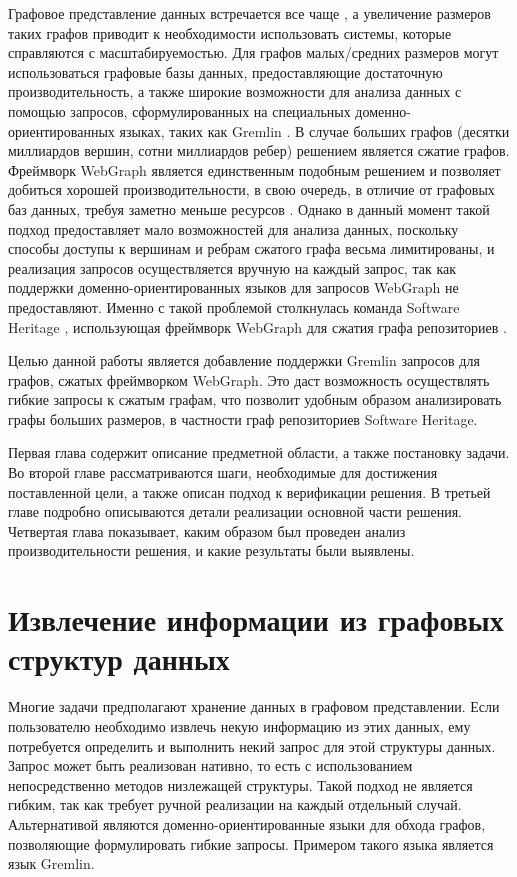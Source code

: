 \documentclass[times,specification,annotation]{itmo-student-thesis}
\begin{document}
Графовое представление данных встречается все чаще \cite{big-graphs-future-arxiv}, а увеличение размеров таких графов приводит к необходимости использовать системы, которые справляются с масштабируемостью. Для графов малых/средних размеров могут использоваться графовые базы данных, предоставляющие достаточную производительность, а также широкие возможности для анализа данных с помощью запросов, сформулированных на специальных доменно-ориентированных языках, таких как Gremlin \cite{gremlin}. В случае больших графов (десятки миллиардов вершин, сотни миллиардов ребер) решением является сжатие графов. Фреймворк WebGraph \cite{webgraph} является единственным подобным решением и позволяет добиться хорошей производительности, в свою очередь, в отличие от графовых баз данных, требуя заметно меньше ресурсов \cite{graph-db-scale, scale-cost, saner}. Однако в данный момент такой подход предоставляет мало возможностей для анализа данных, поскольку способы доступы к вершинам и ребрам сжатого графа весьма лимитированы, и реализация запросов осуществляется вручную на каждый запрос, так как поддержки доменно-ориентированных языков для запросов WebGraph не предоставляют. Именно с такой проблемой столкнулась команда Software Heritage \cite{swh-main-page, swh-intern}, использующая фреймворк WebGraph для сжатия графа репозиториев \cite{saner}.

Целью данной работы является добавление поддержки Gremlin запросов для графов, сжатых фреймворком WebGraph. Это даст возможность осуществлять гибкие запросы к сжатым графам, что позволит удобным образом анализировать графы больших размеров, в частности граф репозиториев Software Heritage.

Первая глава содержит описание предметной области, а также постановку задачи. Во второй главе рассматриваются шаги, необходимые для достижения поставленной цели, а также описан подход к верификации решения. В третьей главе подробно описываются детали реализации основной части решения. Четвертая глава показывает, каким образом был проведен анализ производительности решения, и какие результаты были выявлены.

\chapter{Извлечение информации из графовых структур данных}

Многие задачи предполагают хранение данных в графовом представлении. Если пользователю необходимо извлечь некую информацию из этих данных, ему потребуется определить и выполнить некий запрос для этой структуры данных. Запрос может быть реализован нативно, то есть с использованием непосредственно методов низлежащей структуры. Такой подход не является гибким, так как требует ручной реализации на каждый отдельный случай. Альтернативой являются доменно-ориентированные языки для обхода графов, позволяющие формулировать гибкие запросы. Примером такого языка является язык Gremlin.
\end{document}

